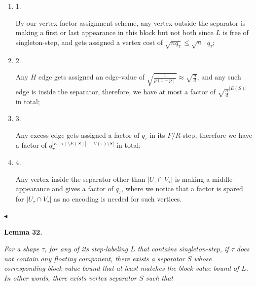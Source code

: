 \documentclass[10pt,a4paper]{article}
\begin{document}
\begin{enumerate}


\item[] 
1. 


By our vertex factor assignment scheme, any vertex outside the separator is making a first or last appearance in this block but not both since $L$ is free of singleton-step, and gets assigned a vertex cost of $\sqrt{nq_{\tau}}\leq\sqrt{n}\cdot q_{\tau}$;\par





\item[] 
2. 


Any $H$ edge gets assigned an edge-value of $\sqrt{\frac{1}{p(1-p)}}\approx\sqrt{\frac{n}{d}}$, and any such edge is inside the separator, therefore, we have at most a factor of $\sqrt{\frac{n}{d}}^{|E(S)|}$ in total;\par





\item[] 
3. 


Any excess edge gets assigned a factor of $q_{\tau}$ in its $F/R$-step, therefore we have a factor of $q_{\tau}^{|E(\tau)\setminus E(S)|-|V(\tau)\setminus S|}$ in total;\par





\item[] 
4. 


Any vertex inside the separator other than $|U_{\tau}\cap V_{\tau}|$ is making a middle appearance and gives a factor of $q_{\tau}$, where we notice that a factor is spared for $|U_{\tau}\cap V_{\tau}|$ as no encoding is needed for such vertices.\par





\end{enumerate}


$\blacktriangleleft$\par





\par\medskip\noindent\textbf{
\textbf{Lemma 32}\textbf{.}
}\par



\emph{For a shape $\tau$, for any of its step-labeling $L$ that contains singleton-step, if $\tau$ does not contain any floating component, there exists a separator $S$ whose corresponding block-value bound that at least matches the block-value bound of $L$. In other words, there exists vertex separator $S$ such that}\par
\end{document}
